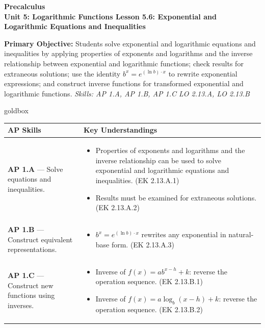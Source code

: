 \documentclass[10pt]{article}
\newcommand{\CourseName}{Precalculus}
\newcommand{\UnitNumberName}{Unit 5: Logarithmic Functions \quad}
\newcommand{\LessonNumberName}{Lesson 5.6: Exponential and Logarithmic Equations and Inequalities}
\begin{document}
\begin{center}
    {\Large\bfseries \CourseName \\
    {\small\bfseries \UnitNumberName \LessonNumberName}}
\end{center}

\begin{tcolorbox}[colback=sky, colframe=navy, boxrule=0.9pt, arc=2mm,
    left=2mm, right=2mm, top=1.5mm, bottom=1.5mm]
    \textbf{Primary Objective:} Students solve exponential and logarithmic equations and
    inequalities by applying properties of exponents and logarithms and the inverse
    relationship between exponential and logarithmic functions; check results for extraneous
    solutions; use the identity $b^x = e^{(\ln b)\cdot x}$ to rewrite exponential expressions;
    and construct inverse functions for transformed exponential and logarithmic functions.
    \hfill\textit{\small Skills: AP 1.A, AP 1.B, AP 1.C \quad LO 2.13.A, LO 2.13.B}
\end{tcolorbox}

\renewcommand{\arraystretch}{1.6}
\begin{skillbox}{goldbox}
\begin{tabularx}{\linewidth}{@{}X X@{}}
\textbf{AP Skills} &
\textbf{Key Understandings} \\
\midrule
\textbf{AP 1.A} --- Solve equations and inequalities. &
\begin{itemize}[leftmargin=1.2em,itemsep=2pt,topsep=0pt]
  \item Properties of exponents and logarithms and the inverse relationship can be used to
        solve exponential and logarithmic equations and inequalities. (EK 2.13.A.1)
  \item Results must be examined for extraneous solutions. (EK 2.13.A.2)
\end{itemize} \\
\textbf{AP 1.B} --- Construct equivalent representations. &
\begin{itemize}[leftmargin=1.2em,itemsep=2pt,topsep=0pt]
  \item $b^x = e^{(\ln b)\cdot x}$ rewrites any exponential in natural-base form.
        (EK 2.13.A.3)
\end{itemize} \\
\textbf{AP 1.C} --- Construct new functions using inverses. &
\begin{itemize}[leftmargin=1.2em,itemsep=2pt,topsep=0pt]
  \item Inverse of $f(x)=ab^{x-h}+k$: reverse the operation sequence. (EK 2.13.B.1)
  \item Inverse of $f(x)=a\log_b(x-h)+k$: reverse the operation sequence. (EK 2.13.B.2)
\end{itemize} \\
\end{tabularx}
\end{skillbox}
\end{document}

